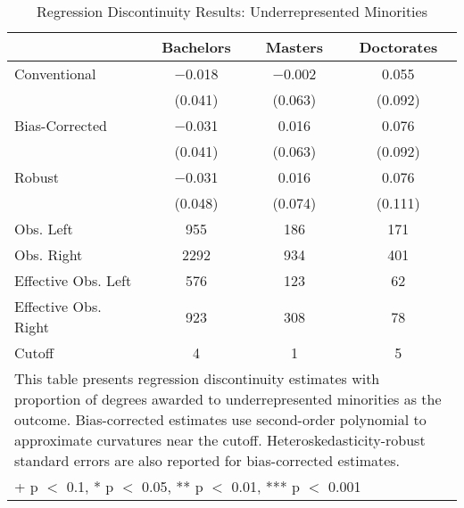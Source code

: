 \begin{table}

\caption{Regression Discontinuity Results: Underrepresented Minorities}
\centering
\begin{tabular}[t]{lccc}
\toprule
  & Bachelors & Masters & Doctorates\\
\midrule
Conventional & \num{-0.018} & \num{-0.002} & \num{0.055}\\
 & (\num{0.041}) & (\num{0.063}) & \vphantom{1} (\num{0.092})\\
Bias-Corrected & \num{-0.031} & \num{0.016} & \num{0.076}\\
 & (\num{0.041}) & (\num{0.063}) & (\num{0.092})\\
Robust & \num{-0.031} & \num{0.016} & \num{0.076}\\
 & (\num{0.048}) & (\num{0.074}) & (\num{0.111})\\
\midrule
Obs. Left & \num{955} & \num{186} & \num{171}\\
Obs. Right & \num{2292} & \num{934} & \num{401}\\
Effective Obs. Left & \num{576} & \num{123} & \num{62}\\
Effective Obs. Right & \num{923} & \num{308} & \num{78}\\
Cutoff & \num{4} & \num{1} & \num{5}\\
\bottomrule
\multicolumn{4}{l}{\rule{0pt}{1em}This table presents regression discontinuity estimates
                with proportion of degrees awarded to underrepresented minorities
                as the outcome. Bias-corrected estimates use second-order polynomial
                to approximate curvatures near the cutoff. Heteroskedasticity-robust
                standard errors are also reported for bias-corrected estimates.}\\
\multicolumn{4}{l}{\rule{0pt}{1em}+ p $<$ 0.1, * p $<$ 0.05, ** p $<$ 0.01, *** p $<$ 0.001}\\
\end{tabular}
\end{table}
